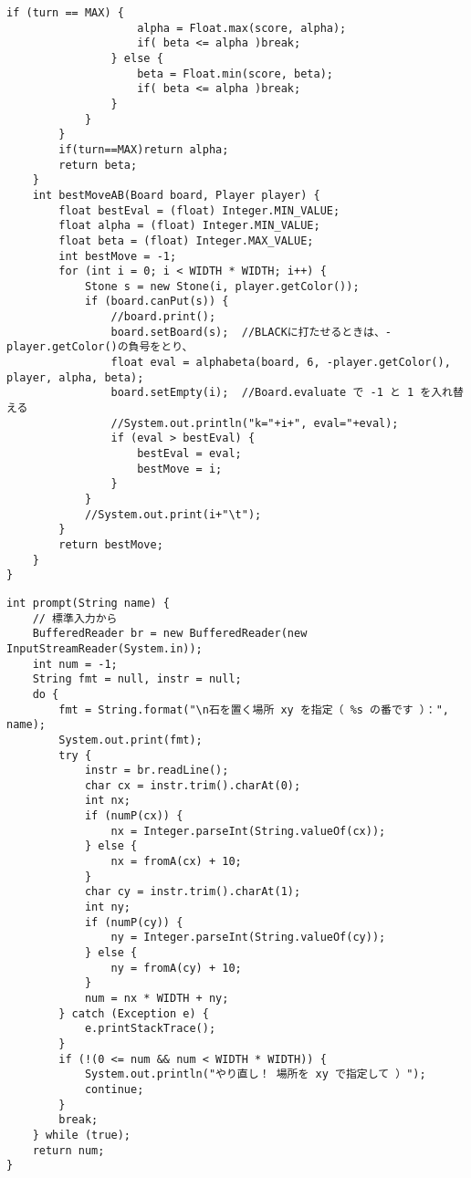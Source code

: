 \documentclass[uplatex,a4paper,11pt,oneside,openany]{jsbook}
\begin{document}
\begin{lstlisting}[caption=戦略クラス：N目並べ,label=prog31]
                if (turn == MAX) {
                    alpha = Float.max(score, alpha);
                    if( beta <= alpha )break;
                } else {
                    beta = Float.min(score, beta);
                    if( beta <= alpha )break;
                }
            }
        }
        if(turn==MAX)return alpha;
        return beta;
    }
    int bestMoveAB(Board board, Player player) {
        float bestEval = (float) Integer.MIN_VALUE;
        float alpha = (float) Integer.MIN_VALUE;
        float beta = (float) Integer.MAX_VALUE;
        int bestMove = -1;
        for (int i = 0; i < WIDTH * WIDTH; i++) {
            Stone s = new Stone(i, player.getColor());
            if (board.canPut(s)) {
                //board.print();
                board.setBoard(s);  //BLACKに打たせるときは、-player.getColor()の負号をとり、
                float eval = alphabeta(board, 6, -player.getColor(), player, alpha, beta);
                board.setEmpty(i);  //Board.evaluate で -1 と 1 を入れ替える
                //System.out.println("k="+i+", eval="+eval);
                if (eval > bestEval) {
                    bestEval = eval;
                    bestMove = i;
                }
            }
            //System.out.print(i+"\t");
        }
        return bestMove;
    }
}
\end{lstlisting}

\begin{lstlisting}[caption=標準入力：戦略クラス内：N目並べ,label=prog32]
int prompt(String name) {
    // 標準入力から
    BufferedReader br = new BufferedReader(new InputStreamReader(System.in));
    int num = -1;
    String fmt = null, instr = null;
    do {
        fmt = String.format("\n石を置く場所 xy を指定（ %s の番です ）：", name);
        System.out.print(fmt);
        try {
            instr = br.readLine();
            char cx = instr.trim().charAt(0);
            int nx;
            if (numP(cx)) {
                nx = Integer.parseInt(String.valueOf(cx));
            } else {
                nx = fromA(cx) + 10;
            }
            char cy = instr.trim().charAt(1);
            int ny;
            if (numP(cy)) {
                ny = Integer.parseInt(String.valueOf(cy));
            } else {
                ny = fromA(cy) + 10;
            }
            num = nx * WIDTH + ny;
        } catch (Exception e) {
            e.printStackTrace();
        }
        if (!(0 <= num && num < WIDTH * WIDTH)) {
            System.out.println("やり直し！ 場所を xy で指定して ）");
            continue;
        }
        break;
    } while (true);
    return num;
}
\end{lstlisting}


%
\begin{thebibliography}{99}
\end{thebibliography}
%
\end{document}

